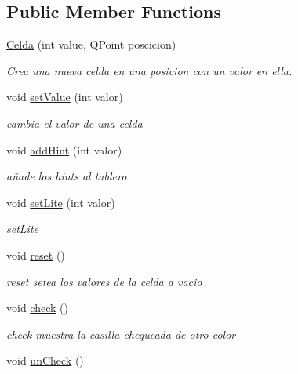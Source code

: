 \subsection*{Public Member Functions}
\begin{DoxyCompactItemize}
\item 
\hyperlink{class_celda_a061c79d4a2ac8b4305d8bb989feec1cd}{Celda} (int value, Q\-Point poscicion)
\begin{DoxyCompactList}\small\item\em Crea una nueva celda en una posicion con un valor en ella. \end{DoxyCompactList}\item 
void \hyperlink{class_celda_a26dd4a943c3b516a00c3c3ec56bd56ac}{set\-Value} (int valor)
\begin{DoxyCompactList}\small\item\em cambia el valor de una celda \end{DoxyCompactList}\item 
void \hyperlink{class_celda_a11857539b9f49484bf5344fbe72288bb}{add\-Hint} (int valor)
\begin{DoxyCompactList}\small\item\em añade los hints al tablero \end{DoxyCompactList}\item 
void \hyperlink{class_celda_a2f36ec0296181ee26477fcdf049f2334}{set\-Lite} (int valor)
\begin{DoxyCompactList}\small\item\em set\-Lite \end{DoxyCompactList}\item 
\hypertarget{class_celda_a3e523de46ddbdb2d8497ad67c0009f1e}{void \hyperlink{class_celda_a3e523de46ddbdb2d8497ad67c0009f1e}{reset} ()}\label{class_celda_a3e523de46ddbdb2d8497ad67c0009f1e}

\begin{DoxyCompactList}\small\item\em reset setea los valores de la celda a vacio \end{DoxyCompactList}\item 
\hypertarget{class_celda_ac93663c46fa34649bf44d3927c7f0ca1}{void \hyperlink{class_celda_ac93663c46fa34649bf44d3927c7f0ca1}{check} ()}\label{class_celda_ac93663c46fa34649bf44d3927c7f0ca1}

\begin{DoxyCompactList}\small\item\em check muestra la casilla chequeada de otro color \end{DoxyCompactList}\item 
\hypertarget{class_celda_a8420b9e44aed858bf90bc0ea8c0984fa}{void \hyperlink{class_celda_a8420b9e44aed858bf90bc0ea8c0984fa}{un\-Check} ()}\label{class_celda_a8420b9e44aed858bf90bc0ea8c0984fa}


\end{DoxyCompactItemize}
